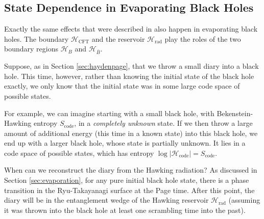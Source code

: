 \documentclass[12pt]{article}
\begin{document}
\subsection{State Dependence in Evaporating Black Holes} \label{sec:statedepend}
Exactly the same effects that were described in \cite{hayden2018learning} also happen in evaporating black holes. The boundary $\mathcal{H}_\text{CFT}$ and the reservoir $\mathcal{H}_\text{rad}$ play the roles of the two boundary regions $\mathcal{H}_B$ and $\mathcal{H}_{\bar B}$. 

Suppose, as in Section \ref{sec:haydenpage}, that we throw a small diary into a black hole. This time, however, rather than knowing the initial state of the black hole exactly, we only know that the initial state was in some large code space of possible states. 

For example, we can imagine starting with a small black hole, with Bekenstein-Hawking entropy $S_\text{code}$, in a \emph{completely unknown} state. If we then throw a large amount of additional energy (this time in a known state) into this black hole, we end up with a larger black hole, whose state is partially unknown. It lies in a code space of possible states, which has entropy $\log |\mathcal{H}_\text{code}| = S_\text{code}$.

When can we reconstruct the diary from the Hawking radiation? As discussed in Section \ref{sec:evaporation}, for any pure initial black hole state, there is a phase transition in the Ryu-Takayanagi surface at the Page time. After this point, the diary will be in the entanglement wedge of the Hawking reservoir $\mathcal{H}_\text{rad}$ (assuming it was thrown into the black hole at least one scrambling time into the past).
\end{document}
